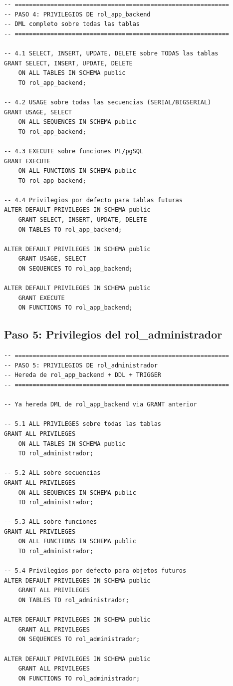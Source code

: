 \documentclass[conference, onecolumn]{IEEEtran}
\begin{document}
\begin{lstlisting}[caption={Privilegios DML para el backend}, label={lst:priv_backend}]
-- ============================================================
-- PASO 4: PRIVILEGIOS DE rol_app_backend
-- DML completo sobre todas las tablas
-- ============================================================

-- 4.1 SELECT, INSERT, UPDATE, DELETE sobre TODAS las tablas
GRANT SELECT, INSERT, UPDATE, DELETE
    ON ALL TABLES IN SCHEMA public
    TO rol_app_backend;

-- 4.2 USAGE sobre todas las secuencias (SERIAL/BIGSERIAL)
GRANT USAGE, SELECT
    ON ALL SEQUENCES IN SCHEMA public
    TO rol_app_backend;

-- 4.3 EXECUTE sobre funciones PL/pgSQL
GRANT EXECUTE
    ON ALL FUNCTIONS IN SCHEMA public
    TO rol_app_backend;

-- 4.4 Privilegios por defecto para tablas futuras
ALTER DEFAULT PRIVILEGES IN SCHEMA public
    GRANT SELECT, INSERT, UPDATE, DELETE
    ON TABLES TO rol_app_backend;

ALTER DEFAULT PRIVILEGES IN SCHEMA public
    GRANT USAGE, SELECT
    ON SEQUENCES TO rol_app_backend;

ALTER DEFAULT PRIVILEGES IN SCHEMA public
    GRANT EXECUTE
    ON FUNCTIONS TO rol_app_backend;
\end{lstlisting}

\subsection{Paso 5: Privilegios del rol\_administrador}

\begin{lstlisting}[caption={Privilegios adicionales del administrador}, label={lst:priv_admin}]
-- ============================================================
-- PASO 5: PRIVILEGIOS DE rol_administrador
-- Hereda de rol_app_backend + DDL + TRIGGER
-- ============================================================

-- Ya hereda DML de rol_app_backend via GRANT anterior

-- 5.1 ALL PRIVILEGES sobre todas las tablas
GRANT ALL PRIVILEGES
    ON ALL TABLES IN SCHEMA public
    TO rol_administrador;

-- 5.2 ALL sobre secuencias
GRANT ALL PRIVILEGES
    ON ALL SEQUENCES IN SCHEMA public
    TO rol_administrador;

-- 5.3 ALL sobre funciones
GRANT ALL PRIVILEGES
    ON ALL FUNCTIONS IN SCHEMA public
    TO rol_administrador;

-- 5.4 Privilegios por defecto para objetos futuros
ALTER DEFAULT PRIVILEGES IN SCHEMA public
    GRANT ALL PRIVILEGES
    ON TABLES TO rol_administrador;

ALTER DEFAULT PRIVILEGES IN SCHEMA public
    GRANT ALL PRIVILEGES
    ON SEQUENCES TO rol_administrador;

ALTER DEFAULT PRIVILEGES IN SCHEMA public
    GRANT ALL PRIVILEGES
    ON FUNCTIONS TO rol_administrador;
\end{lstlisting}
\end{document}
